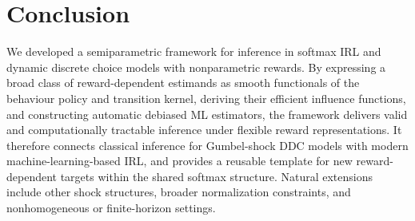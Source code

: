 \documentclass[12pt]{article}
\theoremstyle{plain}
\begin{document}
\section{Conclusion}

We developed a semiparametric framework for inference in softmax IRL and dynamic
discrete choice models with nonparametric rewards. By expressing a broad class
of reward-dependent estimands as smooth functionals of the behaviour policy and
transition kernel, deriving their efficient influence functions, and
constructing automatic debiased ML estimators, the framework delivers valid and
computationally tractable inference under flexible reward representations. It
therefore connects classical inference for Gumbel-shock DDC models with modern
machine-learning-based IRL, and provides a reusable template for new
reward-dependent targets within the shared softmax structure.
Natural extensions include other shock structures, broader normalization
constraints, and nonhomogeneous or finite-horizon settings.




{
 \singlespacing 
 }
\end{document}
